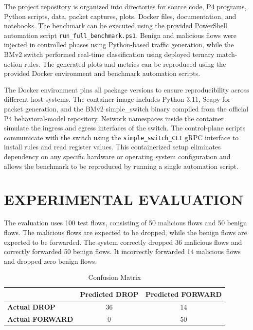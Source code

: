\documentclass[conference]{IEEEtran}
\begin{document}
The project repository is organized into directories for
source code, P4 programs, Python scripts, data, packet
captures, plots, Docker files, documentation, and notebooks.
The benchmark can be executed using the provided PowerShell
automation script \verb|run_full_benchmark.ps1|. Benign and
malicious flows were injected in controlled phases using
Python-based traffic generation, while the BMv2 switch
performed real-time classification using deployed ternary
match-action rules. The generated plots and metrics can be
reproduced using the provided Docker environment and
benchmark automation scripts.

The Docker environment pins all package versions to
ensure reproducibility across different host systems. The
container image includes Python 3.11, Scapy for packet
generation, and the BMv2 simple\_switch binary compiled
from the official P4 behavioral-model repository. Network
namespaces inside the container simulate the ingress and
egress interfaces of the switch. The control-plane scripts
communicate with the switch using the \verb|simple_switch_CLI|
gRPC interface to install rules and read register values. This
containerized setup eliminates dependency on any specific
hardware or operating system configuration and allows the
benchmark to be reproduced by running a single automation
script.

\section{EXPERIMENTAL EVALUATION}

The evaluation uses 100 test flows, consisting of 50 malicious
flows and 50 benign flows. The malicious flows are expected
to be dropped, while the benign flows are expected to be
forwarded. The system correctly dropped 36 malicious flows
and correctly forwarded 50 benign flows. It incorrectly
forwarded 14 malicious flows and dropped zero benign flows.

\begin{table}[H]
\caption{Confusion Matrix}
\label{tab:confusion_matrix}
\centering
\begin{tabular}{lcc}
\toprule
 & \textbf{Predicted DROP} & \textbf{Predicted FORWARD} \\
\midrule
\textbf{Actual DROP} & 36 & 14 \\
\textbf{Actual FORWARD} & 0 & 50 \\
\bottomrule
\end{tabular}
\end{table}
\end{document}
